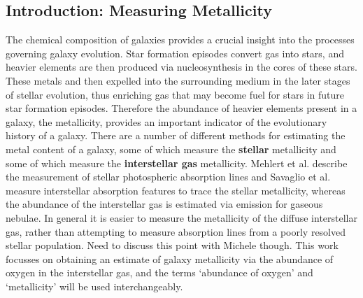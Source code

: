 \documentclass{literature}
\begin{document}
\subsection{Introduction: Measuring Metallicity}\label{sub:intro_measure}
The chemical composition of galaxies provides a crucial insight into the processes governing galaxy evolution. Star formation episodes convert gas into stars, and heavier elements are then produced via nucleosynthesis in the cores of these stars. These metals and then expelled into the surrounding medium in the later stages of stellar evolution, thus enriching gas that may become fuel for stars in future star formation episodes. Therefore the abundance of heavier elements present in a galaxy, the metallicity, provides an important indicator of the evolutionary history of a galaxy. There are a number of different methods for estimating the metal content of a galaxy, some of which measure the \textbf{stellar} metallicity and some of which measure the \textbf{interstellar gas} metallicity. Mehlert \citep{Mehlert2002} et al. describe the measurement of stellar photospheric absorption lines and Savaglio \citep{Savaglio_2004} et al. measure interstellar absorption features to trace the stellar metallicity, whereas the abundance of the interstellar gas is estimated via emission for gaseous nebulae. In general it is easier to measure the metallicity of the diffuse interstellar gas, rather than attempting to measure absorption lines from a poorly resolved stellar population. Need to discuss this point with Michele though. This work focusses on obtaining an estimate of galaxy metallicity via the abundance of oxygen in the interstellar gas, and the terms `abundance of oxygen' and `metallicity' will be used interchangeably. \\
\end{document}
